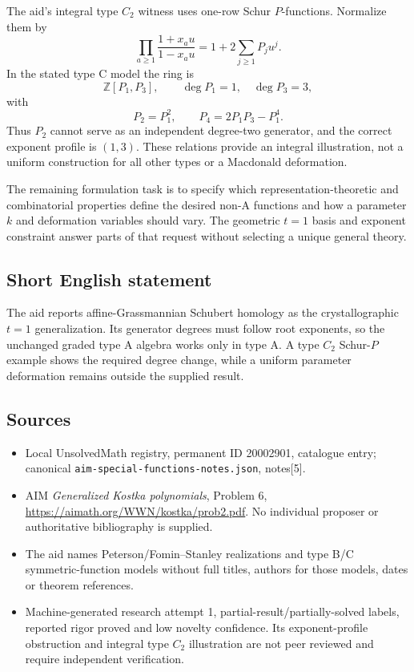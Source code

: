 \documentclass[11pt]{article}
\newcommand{\Z}{\mathbb{Z}}
\begin{document}
The aid's integral type \(C_2\) witness uses one-row Schur \(P\)-functions. Normalize them by
\[
 \prod_{a\ge1}\frac{1+x_a u}{1-x_a u}
       =1+2\sum_{j\ge1}P_j u^j.
\]
In the stated type C model the ring is
\[
 \Z[P_1,P_3],\qquad\deg P_1=1,\quad\deg P_3=3,
\]
with
\[
 P_2=P_1^2,\qquad P_4=2P_1P_3-P_1^4.
\]
Thus \(P_2\) cannot serve as an independent degree-two generator, and the correct exponent profile is \((1,3)\). These relations provide an integral illustration, not a uniform construction for all other types or a Macdonald deformation.

The remaining formulation task is to specify which representation-theoretic and combinatorial properties define the desired non-A functions and how a parameter \(k\) and deformation variables should vary. The geometric \(t=1\) basis and exponent constraint answer parts of that request without selecting a unique general theory.
\subsection{Short English statement}
The aid reports affine-Grassmannian Schubert homology as the crystallographic \(t=1\) generalization. Its generator degrees must follow root exponents, so the unchanged graded type A algebra works only in type A. A type \(C_2\) Schur-\(P\) example shows the required degree change, while a uniform parameter deformation remains outside the supplied result.
\subsection{Sources}
\begin{itemize}
\item Local UnsolvedMath registry, permanent ID 20002901, catalogue entry; canonical \texttt{aim-special-functions-notes.json}, notes[5].
\item AIM \emph{Generalized Kostka polynomials}, Problem 6, \url{https://aimath.org/WWN/kostka/prob2.pdf}. No individual proposer or authoritative bibliography is supplied.
\item The aid names Peterson/Fomin--Stanley realizations and type B/C symmetric-function models without full titles, authors for those models, dates or theorem references.
\item Machine-generated research attempt 1, partial-result/partially-solved labels, reported rigor proved and low novelty confidence. Its exponent-profile obstruction and integral type \(C_2\) illustration are not peer reviewed and require independent verification.
\end{itemize}
\end{document}
